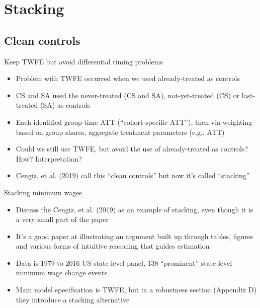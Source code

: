 \documentclass{beamer}
\begin{document}



\section{Stacking}

\subsection{Clean controls}


\begin{frame}{Keep TWFE but avoid differential timing problems}

\begin{itemize}
\item Problem with TWFE occurred when we used already-treated as controls
\item CS and SA used the never-treated (CS and SA), not-yet-treated (CS) or last-treated (SA) as controls
\item Each identified group-time ATT (``cohort-specific ATT''), then via weighting based on group shares, aggregate treatment parameters (e.g., ATT)
\item Could we still use TWFE, but avoid the use of already-treated as controls?  How? Interpretation?
\item  Cengiz, et al. (2019) call this ``clean controls'' but now it's called ``stacking''
\end{itemize}

\end{frame}


\begin{frame}{Stacking minimum wages}

\begin{itemize}
\item Discuss the Cengiz, et al. (2019) as an example of stacking, even though it is a very small part of the paper
\item It's a good paper at illustrating an argument built up through tables, figures and various forms of intuitive reasoning that guides estimation
\item Data is 1979 to 2016 US state-level panel, 138 ``prominent'' state-level minimum wage change events
\item Main model specification is TWFE, but in a robustness section (Appendix D) they introduce a stacking alternative
\end{itemize}

\end{frame}
\end{document}
